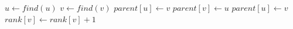 
\begin{algorithm}[!ht]
\begin{footnotesize}
\SetAlgoLined
{}
\Begin
{
    $u \gets find(u)$\;
    $v \gets find(v)$\;
    {
        \Return\;
    }
    {
        $parent[u] \gets v$\;
    }
    {
        $parent[v] \gets u$\;
    }
    \Else
    {
        $parent[u] \gets v$\;
        $rank[v] \gets rank[v] + 1$\;
    }
}
\caption{\textsc{$union$}\label{alg:union}}
\end{footnotesize}
\end{algorithm}